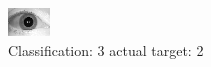 \begin{figure}[h!]
\begin{center}
\includegraphics[width=0.60\columnwidth]{figures/ID1671_class_3_target_2.png}
\end{center}
\caption{ Classification: 3 actual target: 2}
\label{fig:ID1671_class_3_target_2}
\end{figure}
